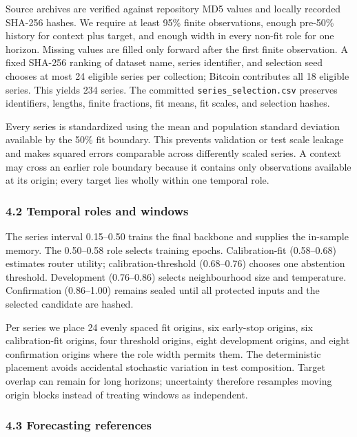 \documentclass[
]{article}
\begin{document}
Source archives are verified against repository MD5 values and locally
recorded SHA-256 hashes. We require at least 95\% finite observations,
enough pre-50\% history for context plus target, and enough width in
every non-fit role for one horizon. Missing values are filled only
forward after the first finite observation. A fixed SHA-256 ranking of
dataset name, series identifier, and selection seed chooses at most 24
eligible series per collection; Bitcoin contributes all 18 eligible
series. This yields 234 series. The committed
\texttt{series\_selection.csv} preserves identifiers, lengths, finite
fractions, fit means, fit scales, and selection hashes.

Every series is standardized using the mean and population standard
deviation available by the 50\% fit boundary. This prevents validation
or test scale leakage and makes squared errors comparable across
differently scaled series. A context may cross an earlier role boundary
because it contains only observations available at its origin; every
target lies wholly within one temporal role.

\subsubsection{4.2 Temporal roles and
windows}\label{42-temporal-roles-and-windows}

The series interval 0.15--0.50 trains the final backbone and supplies
the in-sample memory. The 0.50--0.58 role selects training epochs.
Calibration-fit (0.58--0.68) estimates router utility;
calibration-threshold (0.68--0.76) chooses one abstention threshold.
Development (0.76--0.86) selects neighbourhood size and temperature.
Confirmation (0.86--1.00) remains sealed until all protected inputs and
the selected candidate are hashed.

Per series we place 24 evenly spaced fit origins, six early-stop
origins, six calibration-fit origins, four threshold origins, eight
development origins, and eight confirmation origins where the role width
permits them. The deterministic placement avoids accidental stochastic
variation in test composition. Target overlap can remain for long
horizons; uncertainty therefore resamples moving origin blocks instead
of treating windows as independent.

\subsubsection{4.3 Forecasting
references}\label{43-forecasting-references}
\end{document}
